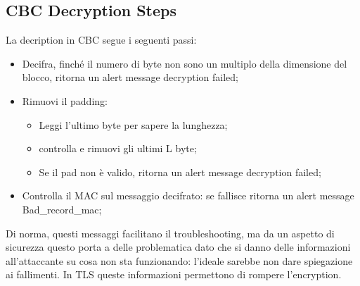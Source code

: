 \documentclass{article}
\theoremstyle{remark}
\begin{document}
\subsection{CBC Decryption Steps}
La decription in CBC segue i seguenti passi:\begin{itemize}
    \item Decifra, finché il numero di byte non sono un multiplo della dimensione del blocco, ritorna un alert message decryption failed;
    \item Rimuovi il padding:\begin{itemize}
        \item Leggi l'ultimo byte per sapere la lunghezza;
        \item controlla e rimuovi gli ultimi L byte;
        \item Se il pad non è valido, ritorna un alert message decryption failed;
    \end{itemize}
    \item Controlla il MAC sul messaggio decifrato: se fallisce ritorna un alert message Bad\_record\_mac;
\end{itemize}
Di norma, questi messaggi facilitano il troubleshooting, ma da un aspetto di sicurezza questo porta a delle problematica dato che si danno delle informazioni all'attaccante su cosa non sta funzionando: l'ideale sarebbe non dare spiegazione ai fallimenti.\newline
In TLS queste informazioni permettono di rompere l'encryption.
\end{document}

